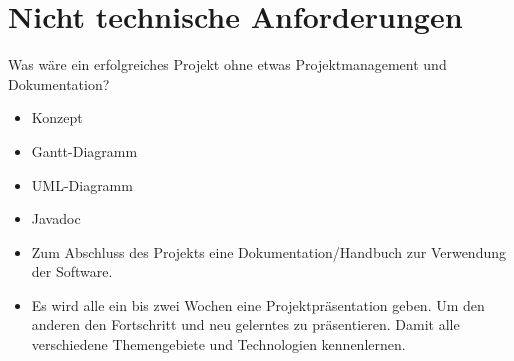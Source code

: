 \documentclass[12pt, oneside]{article}
\begin{document}
\section{Nicht technische Anforderungen}
Was wäre ein erfolgreiches Projekt ohne etwas Projektmanagement und \\ Dokumentation?

\begin{itemize}
	\item Konzept
	\item Gantt-Diagramm
	\item UML-Diagramm
	\item Javadoc
	\item Zum Abschluss des Projekts eine Dokumentation/Handbuch zur Verwendung der Software.
	\item Es wird alle ein bis zwei Wochen eine Projektpräsentation geben. Um den anderen den Fortschritt und neu gelerntes zu präsentieren. Damit alle verschiedene Themengebiete und Technologien kennenlernen.
\end{itemize}
\end{document}
